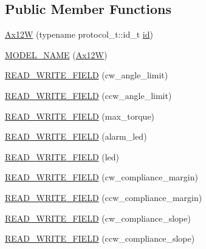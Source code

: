 \subsection*{Public Member Functions}
\begin{DoxyCompactItemize}
\item 
\hyperlink{classdynamixel_1_1servos_1_1_ax12_w_a1bcb20f4269f920f5a711a60f17ca673}{Ax12\+W} (typename protocol\+\_\+t\+::id\+\_\+t \hyperlink{classdynamixel_1_1servos_1_1_servo_a2d022081672e25a7bb57b76706e1cc57}{id})
\item 
\hyperlink{classdynamixel_1_1servos_1_1_ax12_w_a33029af8f00d4263673a842f115bfde3}{M\+O\+D\+E\+L\+\_\+\+N\+A\+M\+E} (\hyperlink{classdynamixel_1_1servos_1_1_ax12_w}{Ax12\+W})
\item 
\hyperlink{classdynamixel_1_1servos_1_1_ax12_w_a683c6a0ff68662bf71614c18b47bcebb}{R\+E\+A\+D\+\_\+\+W\+R\+I\+T\+E\+\_\+\+F\+I\+E\+L\+D} (cw\+\_\+angle\+\_\+limit)
\item 
\hyperlink{classdynamixel_1_1servos_1_1_ax12_w_a9171930faba3a67a43f260aa66759079}{R\+E\+A\+D\+\_\+\+W\+R\+I\+T\+E\+\_\+\+F\+I\+E\+L\+D} (ccw\+\_\+angle\+\_\+limit)
\item 
\hyperlink{classdynamixel_1_1servos_1_1_ax12_w_ac74812e7d19c931e5245164295e417cb}{R\+E\+A\+D\+\_\+\+W\+R\+I\+T\+E\+\_\+\+F\+I\+E\+L\+D} (max\+\_\+torque)
\item 
\hyperlink{classdynamixel_1_1servos_1_1_ax12_w_a9d3e36ab7f682a89f3a1054045411af7}{R\+E\+A\+D\+\_\+\+W\+R\+I\+T\+E\+\_\+\+F\+I\+E\+L\+D} (alarm\+\_\+led)
\item 
\hyperlink{classdynamixel_1_1servos_1_1_ax12_w_ae2f91de17f564cf35f36e581ab359d7f}{R\+E\+A\+D\+\_\+\+W\+R\+I\+T\+E\+\_\+\+F\+I\+E\+L\+D} (led)
\item 
\hyperlink{classdynamixel_1_1servos_1_1_ax12_w_abf4199e64359251ca70f701f4dd43b11}{R\+E\+A\+D\+\_\+\+W\+R\+I\+T\+E\+\_\+\+F\+I\+E\+L\+D} (cw\+\_\+compliance\+\_\+margin)
\item 
\hyperlink{classdynamixel_1_1servos_1_1_ax12_w_a9574fd50704590ae0580889ac06b6ca7}{R\+E\+A\+D\+\_\+\+W\+R\+I\+T\+E\+\_\+\+F\+I\+E\+L\+D} (ccw\+\_\+compliance\+\_\+margin)
\item 
\hyperlink{classdynamixel_1_1servos_1_1_ax12_w_a04f43f632e9227b74062ad8dc8c3d955}{R\+E\+A\+D\+\_\+\+W\+R\+I\+T\+E\+\_\+\+F\+I\+E\+L\+D} (cw\+\_\+compliance\+\_\+slope)
\item 
\hyperlink{classdynamixel_1_1servos_1_1_ax12_w_ab8aa5f9bf53e350dcdef7a4305ab15af}{R\+E\+A\+D\+\_\+\+W\+R\+I\+T\+E\+\_\+\+F\+I\+E\+L\+D} (ccw\+\_\+compliance\+\_\+slope)

\end{DoxyCompactItemize}
